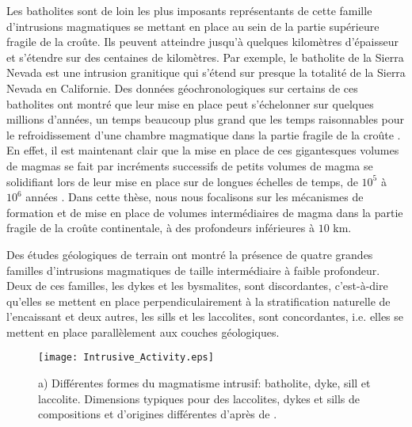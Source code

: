 Les batholites sont de loin  les plus imposants représentants de cette
famille d'intrusions  magmatiques se  mettant en place  au sein  de la
partie supérieure fragile de la  croûte. Ils peuvent atteindre jusqu'à
quelques  kilomètres d'épaisseur  et  s'étendre sur  des centaines  de
kilomètres.  Par exemple,  le batholite  de la  Sierra Nevada  est une
intrusion granitique qui s'étend sur  presque la totalité de la Sierra
Nevada en  Californie. Des  données géochronologiques sur  certains de
ces batholites ont montré que leur mise en place peut s'échelonner sur
quelques millions d'années, un temps beaucoup plus grand que les temps
raisonnables pour le refroidissement  d'une chambre magmatique dans la
partie fragile de  la croûte \citep{Glazner:2004gv}. En  effet, il est
maintenant clair que  la mise en place de ces  gigantesques volumes de
magmas se fait par incréments successifs de petits volumes de magma se
solidifiant lors  de leur  mise en  place sur  de longues  échelles de
temps,         de        $10^5$         à        $10^6$         années
\citep{Petford:2000cc,Glazner:2004gv}.  Dans  cette thèse,  nous  nous
focalisons sur  les mécanismes  de formation  et de  mise en  place de
volumes intermédiaires  de magma dans  la partie fragile de  la croûte
continentale, à des profondeurs inférieures à $10$ km.

Des études géologiques de terrain ont montré la présence de quatre
grandes familles d'intrusions magmatiques de taille intermédiaire à
faible profondeur. Deux de ces familles, les dykes et les bysmalites,
sont discordantes, c'est-à-dire qu'elles se mettent en place
perpendiculairement à la stratification naturelle de l'encaissant et
deux autres, les sills et les laccolites, sont concordantes,
i.e. elles se mettent en place parallèlement aux couches géologiques.

\begin{figure}[htpb]
 \begin{center}
 \graphicspath{ {/Users/thorey/Documents/These/Manuscript/Figure/Chapter1/} }
 \texttt{[image: Intrusive\_Activity.eps]}
 \caption{a) Différentes formes du magmatisme intrusif: batholite,
 dyke, sill et laccolite. Dimensions typiques pour des
 laccolites, dykes et sills de compositions et d'origines
 différentes d'après de \citet{Cruden:tg}. }
 \label{C1-Dimension}
 \end{center}
\end{figure}

